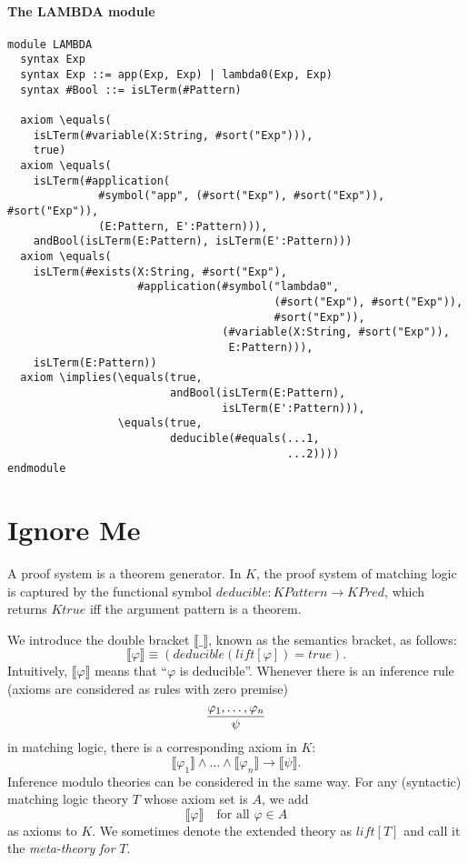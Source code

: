 \documentclass[UTF8,11pt]{article}
\theoremstyle{plain}
\theoremstyle{definition}
\theoremstyle{remark}
\newcommand{\Bracket}[1]
    {\llbracket#1\rrbracket}
\newcommand{\KPred}{\mathit{KPred}}
\newcommand{\Ktrue}{\mathit{Ktrue}}
\newcommand{\KPattern}{\mathit{KPattern}}
\begin{document}
\paragraph{The {\small LAMBDA} module}\quad
\begin{Verbatim}[fontsize=\small]
module LAMBDA
  syntax Exp
  syntax Exp ::= app(Exp, Exp) | lambda0(Exp, Exp)
  syntax #Bool ::= isLTerm(#Pattern)

  axiom \equals(
    isLTerm(#variable(X:String, #sort("Exp"))), 
    true)
  axiom \equals(
    isLTerm(#application(
              #symbol("app", (#sort("Exp"), #sort("Exp")), #sort("Exp")),
              (E:Pattern, E':Pattern))),
    andBool(isLTerm(E:Pattern), isLTerm(E':Pattern)))
  axiom \equals(
    isLTerm(#exists(X:String, #sort("Exp"),
                    #application(#symbol("lambda0",
                                         (#sort("Exp"), #sort("Exp")),
                                         #sort("Exp")),
                                 (#variable(X:String, #sort("Exp")),
                                  E:Pattern))),
    isLTerm(E:Pattern))
  axiom \implies(\equals(true, 
                         andBool(isLTerm(E:Pattern), 
                                 isLTerm(E':Pattern))),
                 \equals(true,
                         deducible(#equals(...1,
                                           ...2)))) 
endmodule
\end{Verbatim}

\section{Ignore Me}
A proof system is a theorem generator. 
In $K$, the proof system of matching logic is captured by the functional symbol 
$\mathit{deducible} \colon \KPattern \to \KPred$, which returns $\Ktrue$ 
iff the argument pattern is a theorem. 

We introduce the double bracket $\Bracket{\_}$, known as the semantics bracket, as follows:
\begin{equation*}
\Bracket{\varphi} \equiv 
\left(\textit{deducible}\left(\mathit{lift}[\varphi]\right) = true\right).
\end{equation*}
Intuitively, $\Bracket{\varphi}$ means that ``$\varphi$ is deducible''.
Whenever there is an inference rule (axioms are considered as rules with zero 
premise)
$$
\infer{\psi}
{\varphi_1,\dots,\varphi_n}
$$
in matching logic, there is a corresponding axiom in $K$:
$$
\Bracket{\varphi_1} \wedge \dots \wedge \Bracket{\varphi_n} \to \Bracket{\psi}.
$$
Inference modulo theories can be considered in the same way. 
For any (syntactic) matching logic theory $T$ whose axiom set is $A$, we add
$$
\Bracket{\varphi} \quad \text{for all $\varphi \in A$}
$$
as axioms to $K$. We sometimes denote the extended theory as $\mathit{lift}[T]$ 
and call it 
the \emph{meta-theory for} $T$.



\end{document}
